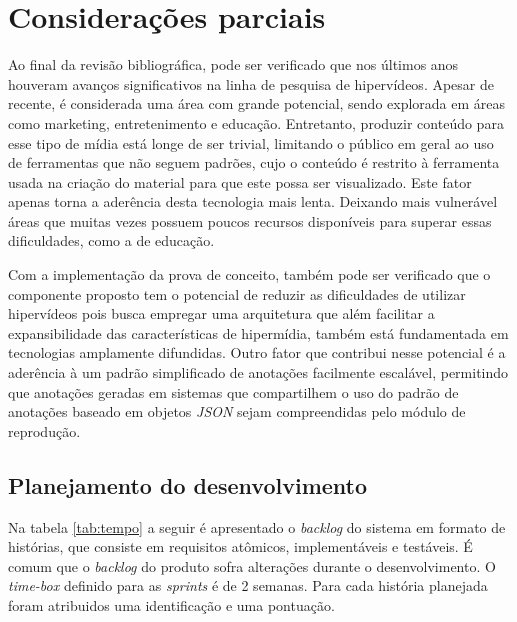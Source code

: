 \chapter[Considerações parciais]{Considerações parciais}

Ao final da revisão bibliográfica, pode ser verificado que nos últimos anos houveram avanços significativos na linha de pesquisa de hipervídeos. Apesar de recente, é considerada uma área com grande potencial, sendo explorada em áreas como marketing, entretenimento e educação. Entretanto, produzir conteúdo para esse tipo de mídia está longe de ser trivial, limitando o público em geral ao uso de ferramentas que não seguem padrões, cujo o conteúdo é restrito à ferramenta usada na criação do material para que este possa ser visualizado. Este fator apenas torna a aderência desta tecnologia mais lenta. Deixando mais vulnerável áreas que muitas vezes possuem poucos recursos disponíveis para superar essas dificuldades, como a de educação.

Com a implementação da prova de conceito, também pode ser verificado que o componente proposto tem o potencial de reduzir as dificuldades de utilizar hipervídeos pois busca empregar uma arquitetura que além facilitar a expansibilidade das características de hipermídia, também está fundamentada em tecnologias amplamente difundidas. Outro fator que contribui nesse potencial é a aderência à um padrão simplificado de anotações facilmente escalável, permitindo que anotações geradas em sistemas que compartilhem o uso do padrão de anotações baseado em objetos \textit{JSON} sejam compreendidas pelo módulo de reprodução.

\section{Planejamento do desenvolvimento}

Na tabela \ref{tab:tempo} a seguir é apresentado o \textit{backlog} do sistema em formato de histórias, que consiste em requisitos atômicos, implementáveis e testáveis. É comum que o \textit{backlog} do produto sofra alterações durante o desenvolvimento. O \textit{time-box} definido para as \textit{sprints} é de 2 semanas. Para cada história planejada foram atribuidos uma identificação e uma pontuação.

